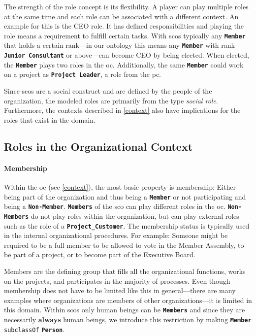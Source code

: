 \documentclass[a4paper, DIV=13, BCOR=0cm]{scrbook}
\newcommand{\class}[1]{\texttt{\textbf{#1}}}
\newcommand{\relation}[1]{\texttt{#1}}
\begin{document}
The strength of the role concept is its flexibility. A player can play multiple roles at the same time and each role can be associated with a different context. An example for this is the CEO role. It has defined responsibilities and playing the role means a requirement to fulfill certain tasks. With \glspl{sco} typically any \class{Member} that holds a certain rank---in our ontology this means any \class{Member} with rank \class{Junior Consultant} or above---can become CEO by being elected. When elected, the \class{Member} plays two roles in the \gls{oc}. Additionally, the same \class{Member} could work on a project as \class{Project Leader}, a role from the \gls{pc}.

Since \glspl{sco} are a social construct and are defined by the people of the organization, the modeled roles are primarily from the type \textit{social role}. Furthermore, the contexts described in \autoref{context} also have implications for the roles that exist in the domain.

\subsection{Roles in the Organizational Context}

\paragraph{Membership}
\label{membership}
Within the \gls{oc} (see \autoref{context}), the most basic property is membership: Either being part of the organization and thus being a \class{Member} or not participating and being a \class{Non-Member}. \class{Members} of the \gls{sco} can play different roles in the \gls{oc}. \class{Non-Members} do not play roles within the organization, but can play external roles such as the role of a \class{Project\_Customer}. The membership status is typically used in the internal organizational procedures. For example: Someone might be required to be a full member to be allowed to vote in the Member Assembly, to be part of a project, or to become part of the Executive Board.

Members are the defining group that fills all the organizational functions, works on the projects, and participates in the majority of processes. Even though membership does not have to be limited like this in general---there are many examples where organizations are members of other organizations---it is limited in this domain. Within \glspl{sco} only human beings can be \class{Members} and since they are necessarily \textbf{always} human beings, we introduce this restriction by making \class{Member} \relation{subclassOf} \class{Person}.
\end{document}
